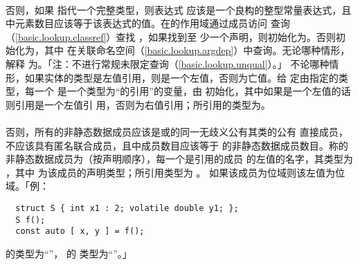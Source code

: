 \paragraph{}
否则，如果 指代一个完整类型，则表达式
应该是一个良构的整型常量表达式，且
中元素数目应该等于该表达式的值。在的作用域通过成员访问
查询（\ref{basic.lookup.classref}）查找 ，如果找到至
少一个声明，则初始化为。否则初始化为，其中
在关联命名空间（\ref{basic.lookup.argdep}）中查询。无论哪种情形，解释
为。「注：不进行常规未限定查询（\ref{basic.lookup.unqual}）。」
不论哪种情形，如果实体的类型是左值引用，则是一个左值，否则为亡值。给
定由指定的类型，每一个
是一个类型为``的引用''的变量，由
初始化，其中如果是一个左值的话则引用是一个左值引
用，否则为右值引用；所引用的类型为。

\paragraph{}
否则，所有的非静态数据成员应该是或的同一无歧义公有其类的公有
直接成员，不应该具有匿名联合成员，且中成员数目应该等于
的非静态数据成员数目。称的非静态数据成员为（按声明顺序），每一个是引用的成员
的左值的名字，其类型为 ，其中
为该成员的声明类型；所引用类型为 。
如果该成员为位域则该左值为位域。「例：
\begin{lstlisting}
  struct S { int x1 : 2; volatile double y1; };
  S f();
  const auto [ x, y ] = f();
\end{lstlisting}
 的类型为``''， 的
类型为``''。」

